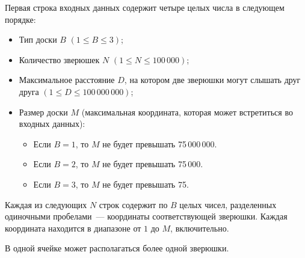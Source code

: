 Первая строка входных данных содержит четыре целых числа в следующем порядке: 

\begin{itemize}
\item Тип доски $B$ $(1 \le B \le 3)$;

\item Количество зверюшек $N$ $(1 \le N \le 100\,000)$; 

\item Максимальное расстояние $D$, на котором две зверюшки могут слышать друг друга
$(1 \le D \le 100\,000\,000)$;

\item Размер доски $M$ (максимальная координата, которая может встретиться во входных данных):

\begin{itemize}
\item Если $B=1$, то $M$ не будет превышать 75\,000\,000. 
\item Если $B=2$, то $M$ не будет превышать 75\,000. 
\item Если $B=3$, то $M$ не будет превышать 75. 
\end{itemize}
\end{itemize}

Каждая из следующих $N$ строк содержит по $B$ целых чисел, разделенных одиночными пробелами~---
координаты соответствующей зверюшки. Каждая координата находится в диапазоне от $1$ до $M$,
включительно. 

В одной ячейке может располагаться более одной зверюшки.
